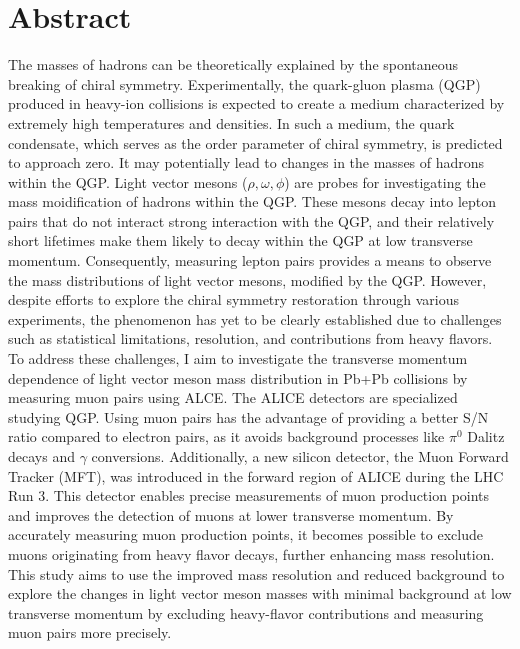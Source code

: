 \section*{Abstract}
The masses of hadrons can be theoretically explained by the spontaneous breaking of chiral symmetry. Experimentally, the quark-gluon plasma (QGP) produced in heavy-ion collisions is expected to create a medium characterized by extremely high temperatures and densities. In such a medium, the quark condensate, which serves as the order parameter of chiral symmetry, is predicted to approach zero. It may potentially lead to changes in the masses of hadrons within the QGP.
Light vector mesons ($\rho, \omega, \phi$) are  probes for investigating the mass moidification of hadrons within the QGP. These mesons decay into lepton pairs that do not interact strong interaction with the QGP, and their relatively short lifetimes make them likely to decay within the QGP at low transverse momentum. Consequently, measuring lepton pairs provides a means to observe the mass distributions of light vector mesons, modified by the QGP.
However, despite efforts to explore the chiral symmetry restoration through various experiments, the phenomenon has yet to be clearly established due to challenges such as statistical limitations, resolution, and contributions from heavy flavors. To address these challenges, I aim to investigate the transverse momentum dependence of light vector meson mass distribution in Pb+Pb collisions by measuring muon pairs using ALCE. The ALICE detectors are specialized studying QGP.
Using muon pairs has the advantage of providing a better S/N ratio compared to electron pairs, as it avoids background processes like $\pi^0$ Dalitz decays and $\gamma$ conversions. Additionally, a new silicon detector, the Muon Forward Tracker (MFT), was introduced in the forward region of ALICE during the LHC Run 3.
This detector enables precise measurements of muon production points and improves the detection of muons at lower transverse momentum. By accurately measuring muon production points, it becomes possible to exclude muons originating from heavy flavor decays, further enhancing mass resolution.
This study aims to use the improved mass resolution and reduced background to explore the changes in light vector meson masses with minimal background at low transverse momentum by excluding heavy-flavor contributions and measuring muon pairs more precisely.

